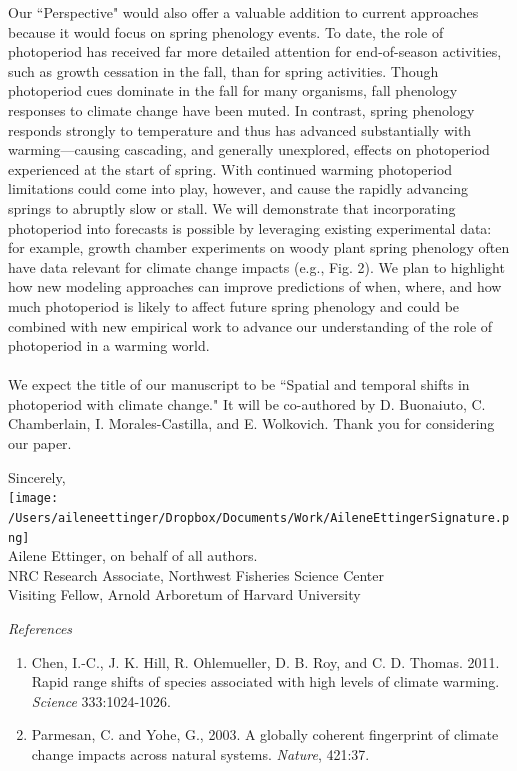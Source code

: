 \documentclass[10.5pt,a4paper]{letter}
\begin{document}
\begin{letter}{}
Our ``Perspective" would also offer a valuable addition to current approaches because it would focus on spring phenology events. To date, the role of photoperiod has received far more detailed attention for end-of-season activities, such as growth cessation in the fall, than for spring activities. Though photoperiod cues dominate in the fall for many organisms, fall phenology responses to climate change have been muted. In contrast, spring phenology responds strongly to temperature and thus has advanced substantially with warming---causing cascading, and generally unexplored, effects on photoperiod experienced at the start of spring. With continued warming photoperiod limitations could come into play, however, and cause the rapidly advancing springs to abruptly slow or stall. We will demonstrate that incorporating photoperiod into forecasts is possible by leveraging existing experimental data: for example, growth chamber experiments on woody plant spring phenology often have data relevant for climate change impacts (e.g., Fig. 2). We plan to highlight how new modeling approaches can improve predictions of when, where, and how much photoperiod is likely to affect future spring phenology and could be combined with new empirical work to advance our understanding of the role of photoperiod in a warming world. 
\\
\\
We expect the title of our manuscript to be ``Spatial and temporal shifts in photoperiod with climate change."  It will be co-authored by D. Buonaiuto, C. Chamberlain, I. Morales-Castilla, and E. Wolkovich. Thank you for considering our paper.

Sincerely,\\

\texttt{[image: /Users/aileneettinger/Dropbox/Documents/Work/AileneEttingerSignature.png]} \\
Ailene Ettinger, on behalf of all authors.
\\
NRC Research Associate, Northwest Fisheries Science Center
\\
Visiting Fellow, Arnold Arboretum of Harvard University

\noindent \emph{References}
\begin{footnotesize}
\begin{enumerate}
\item Chen, I.-C., J. K. Hill, R. Ohlemueller, D. B. Roy, and C. D. Thomas. 2011. Rapid range shifts of species associated with high levels of climate warming.  \emph{Science} 333:1024-1026.
\item Parmesan, C. and Yohe, G., 2003. A globally coherent fingerprint of climate change impacts across natural systems.  \emph{Nature}, 421:37.


\end{enumerate}
\end{footnotesize}
\end{letter}
\end{document}
